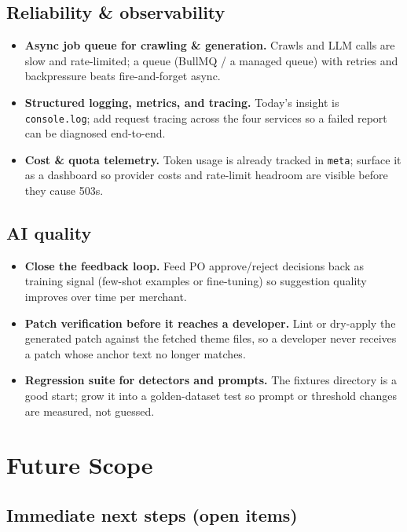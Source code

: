 \documentclass[11pt,a4paper]{article}
\begin{document}
\subsection{Reliability \& observability}
\begin{itemize}[leftmargin=1.4em]
  \item \textbf{Async job queue for crawling \& generation.} Crawls and LLM
  calls are slow and rate-limited; a queue (BullMQ / a managed queue) with
  retries and backpressure beats fire-and-forget async.
  \item \textbf{Structured logging, metrics, and tracing.} Today's insight is
  \texttt{console.log}; add request tracing across the four services so a
  failed report can be diagnosed end-to-end.
  \item \textbf{Cost \& quota telemetry.} Token usage is already tracked in
  \texttt{meta}; surface it as a dashboard so provider costs and rate-limit
  headroom are visible before they cause 503s.
\end{itemize}

\subsection{AI quality}
\begin{itemize}[leftmargin=1.4em]
  \item \textbf{Close the feedback loop.} Feed PO approve/reject decisions back
  as training signal (few-shot examples or fine-tuning) so suggestion quality
  improves over time per merchant.
  \item \textbf{Patch verification before it reaches a developer.} Lint or
  dry-apply the generated patch against the fetched theme files, so a developer
  never receives a patch whose anchor text no longer matches.
  \item \textbf{Regression suite for detectors and prompts.} The fixtures
  directory is a good start; grow it into a golden-dataset test so prompt or
  threshold changes are measured, not guessed.
\end{itemize}

\section{Future Scope}\label{sec:future}

\subsection{Immediate next steps (open items)}
\end{document}
